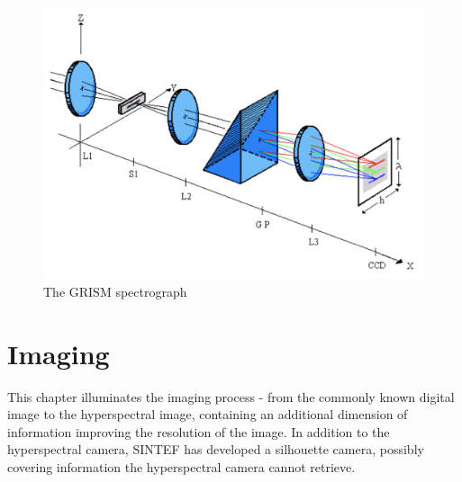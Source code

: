 \begin{figure}[H]
    \centering
    \includegraphics[width = 12cm]{Images/theory/grismspec.png}
    \caption{The GRISM spectrograph}
    \label{fig:grismspec}
\end{figure}


\chapter{Imaging} %
\label{chap:theory2}

This chapter illuminates the imaging process - from the commonly known digital image to the hyperspectral image, containing an additional dimension of information improving the resolution of the image. In addition to the hyperspectral camera, SINTEF has developed a silhouette camera, possibly covering information the hyperspectral camera cannot retrieve.


